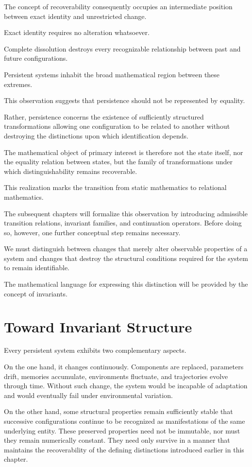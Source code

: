 \documentclass[11pt]{book}
\numberwithin{equation}{chapter}
\theoremstyle{definition}
\theoremstyle{plain}
\begin{document}
The concept of recoverability consequently occupies an intermediate position between exact identity and unrestricted change.

Exact identity requires no alteration whatsoever.

Complete dissolution destroys every recognizable relationship between past and future configurations.

Persistent systems inhabit the broad mathematical region between these extremes.

This observation suggests that persistence should not be represented by equality.

Rather, persistence concerns the existence of sufficiently structured transformations allowing one configuration to be related to another without destroying the distinctions upon which identification depends.

The mathematical object of primary interest is therefore not the state itself, nor the equality relation between states, but the family of transformations under which distinguishability remains recoverable.

This realization marks the transition from static mathematics to relational mathematics.

The subsequent chapters will formalize this observation by introducing admissible transition relations, invariant families, and continuation operators. Before doing so, however, one further conceptual step remains necessary.

We must distinguish between changes that merely alter observable properties of a system and changes that destroy the structural conditions required for the system to remain identifiable.

The mathematical language for expressing this distinction will be provided by the concept of invariants.

\section{Toward Invariant Structure}

Every persistent system exhibits two complementary aspects.

On the one hand, it changes continuously. Components are replaced, parameters drift, memories accumulate, environments fluctuate, and trajectories evolve through time. Without such change, the system would be incapable of adaptation and would eventually fail under environmental variation.

On the other hand, some structural properties remain sufficiently stable that successive configurations continue to be recognized as manifestations of the same underlying entity. These preserved properties need not be immutable, nor must they remain numerically constant. They need only survive in a manner that maintains the recoverability of the defining distinctions introduced earlier in this chapter.
\end{document}
